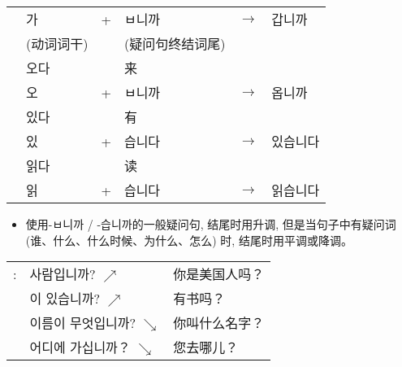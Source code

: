 \begin{grammar}
\begin{grammarsect}
\begin{tabular}{llllll}
            &\kr 가&+&\kr ㅂ니까&$\to$&\kr 갑니까\\
            &(动词词干)&&(疑问句终结词尾)\\
            &\kr 오다&&来\\
            &\kr 오&+&\kr ㅂ니까&$\to$&\kr 옵니까\\
            &\kr 있다&&有\\
            &\kr 있&+&\kr 습니다&$\to$&\kr 있습니다\\
            &\kr 읽다&&读\\
            &\kr 읽&+&\kr 습니다&$\to$&\kr 읽습니다\\
        \end{tabular}
    \end{grammarsect}
    \begin{itemize}
        \item 使用{\kr -ㅂ니까 / -습니까}的一般疑问句, 结尾时用升调, 但是当句子中有疑问词 (谁、什么、什么时候、为什么、怎么) 时, 结尾时用平调或降调。
    \end{itemize}
    \begin{tabular}{lll}
            \kr \ruby{例}{예}:&\kr \ruby{美國}{미국} 사람입니까? $\nearrow$&你是美国人吗？\\
            &\kr \ruby{冊}{책}이 있습니까? $\nearrow$&有书吗？\\
            &\kr 이름이 무엇입니까? $\searrow$&你叫什么名字？\\
            &\kr 어디에 가십니까？ $\searrow$&您去哪儿？
        \end{tabular}\\
\end{grammar}
